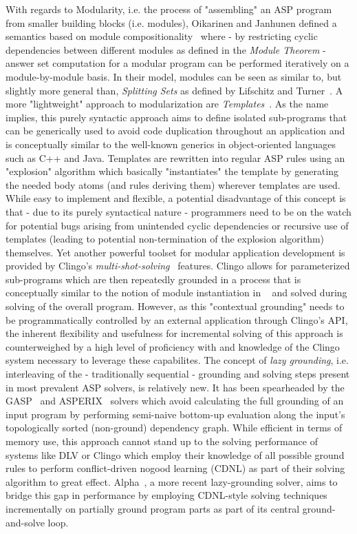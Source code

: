 \documentclass[12pt, letterpaper, twoside]{scrartcl}
\begin{document}
With regards to Modularity, i.e. the process of "assembling" an ASP program from smaller building blocks (i.e. modules), Oikarinen and Janhunen defined a semantics based on module compositionality~\cite{modules-compositionality} where - by restricting cyclic dependencies between different modules as defined in the \emph{Module Theorem} - answer set computation for a modular program can be performed iteratively on a module-by-module basis. In their model, modules can be seen as similar to, but slightly more general than, \emph{Splitting Sets} as defined by Lifschitz and Turner~\cite{splitting-sets}. 
A more "lightweight" approach to modularization are \emph{Templates}~\cite{templates}. As the name implies, this purely syntactic approach aims to define isolated sub-programs that can be generically used to avoid code duplication throughout an application and is conceptually similar to the well-known generics in object-oriented languages such as C++ and Java. Templates are rewritten into regular ASP rules using an "explosion" algorithm which basically "instantiates" the template by generating the needed body atoms (and rules deriving them) wherever templates are used. While easy to implement and flexible, a potential disadvantage of this concept is that - due to its purely syntactical nature - programmers need to be on the watch for potential bugs arising from unintended cyclic dependencies or recursive use of templates (leading to potential non-termination of the explosion algorithm) themselves.
Yet another powerful toolset for modular application development is provided by Clingo's \emph{multi-shot-solving}~\cite{clingo-multishot} features. Clingo allows for parameterized sub-programs which are then repeatedly grounded in a process that is conceptually similar to the notion of module instantiation in ~\cite{modules-compositionality} and solved during solving of the overall program. However, as this "contextual grounding" needs to be programmatically controlled by an external application through Clingo's API, the inherent flexibility and usefulness for incremental solving of this approach is counterweighed by a high level of proficiency with and knowledge of the Clingo system necessary to leverage these capabilites.
The concept of \emph{lazy grounding}, i.e. interleaving of the - traditionally sequential - grounding and solving steps present in most prevalent ASP solvers, is relatively new. It has been spearheaded by the GASP~\cite{gasp-compseq} and ASPERIX~\cite{asperix} solvers which avoid calculating the full grounding of an input program by performing semi-naive bottom-up evaluation along the input's topologically sorted (non-ground) dependency graph. While efficient in terms of memory use, this approach cannot stand up to the solving performance of systems like DLV or Clingo which employ their knowledge of all possible ground rules to perform conflict-driven nogood learning (CDNL) as part of their solving algorithm to great effect. Alpha~\cite{alpha}, a more recent lazy-grounding solver, aims to bridge this gap in performance by employing CDNL-style solving techniques~\cite{alpha-cdnl} incrementally on partially ground program parts as part of its central ground-and-solve loop.
\end{document}
